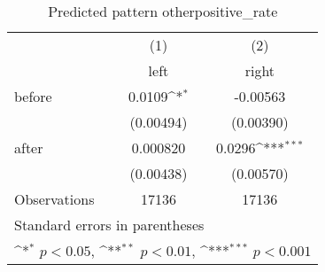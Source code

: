\begin{table}[htbp]\centering
\def\sym#1{\ifmmode^{#1}\else\(^{#1}\)\fi}
\caption{Predicted pattern otherpositive\_rate}
\begin{tabular}{l*{2}{c}}
\hline\hline
                    &\multicolumn{1}{c}{(1)}&\multicolumn{1}{c}{(2)}\\
                    &\multicolumn{1}{c}{left}&\multicolumn{1}{c}{right}\\
\hline
before              &      0.0109\sym{*}  &    -0.00563         \\
                    &   (0.00494)         &   (0.00390)         \\
[1em]
after               &    0.000820         &      0.0296\sym{***}\\
                    &   (0.00438)         &   (0.00570)         \\
\hline
Observations        &       17136         &       17136         \\
\hline\hline
\multicolumn{3}{l}{\footnotesize Standard errors in parentheses}\\
\multicolumn{3}{l}{\footnotesize \sym{*} \(p<0.05\), \sym{**} \(p<0.01\), \sym{***} \(p<0.001\)}\\
\end{tabular}
\end{table}
